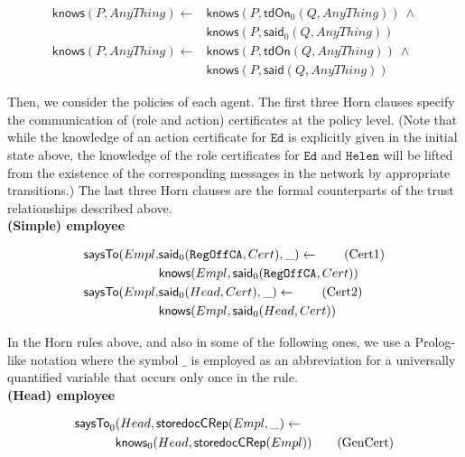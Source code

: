 \documentclass[conference]{IEEEtran}
\begin{document}
\begin{LONG}
\begin{small}\begin{align*}
\mathsf{knows}(P,AnyThing) \leftarrow & \mathsf{knows}(P,\mathsf{tdOn}_{0}(Q,AnyThing)) ~ \wedge \\
											                  & \mathsf{knows}(P,\mathsf{said}_{0}(Q,AnyThing)) \\
\mathsf{knows}(P,AnyThing)  \leftarrow & \mathsf{knows}(P,\mathsf{tdOn}(Q,AnyThing)) ~ \wedge \\
                                                               & \mathsf{knows}(P,\mathsf{said}(Q,AnyThing))
 \end{align*} \end{small}

Then, we consider the policies of each agent.  The first three Horn
clauses specify the communication of (role and action) certificates at
the policy level.  (Note that while the knowledge of an action
certificate for $\mathtt{Ed}$ is explicitly given in the initial state above,
the knowledge of the role certificates for $\mathtt{Ed}$ and $\mathtt{Helen}$ will be
lifted from the existence of the corresponding messages in the network
by appropriate transitions.)  The last three Horn clauses are the
formal counterparts of the trust relationships described above.\\

\noindent
\textbf{(Simple) employee }
  
\begin{small}\begin{align}
\mathsf{saysTo}(Empl,& \mathsf{said}_{0} (\mathtt{RegOffCA},Cert),\_) \leftarrow \tag{Cert1}\\
& \mathsf{knows}(Empl,\mathsf{said}_{0}(\mathtt{RegOffCA},Cert)) \notag \\
\mathsf{saysTo}(Empl,& \mathsf{said}_{0} (Head,Cert),\_) \leftarrow \tag{Cert2} \\
& \mathsf{knows}(Empl,\mathsf{said}_{0}(Head,Cert)) \notag
\end{align}\end{small}

In the Horn rules above, and also in some of the following ones, we use a
Prolog-like notation where the symbol $\_$ is employed as an abbreviation
for a universally quantified variable that occurs only once in the rule.\\

\noindent
\textbf{(Head) employee}

\begin{small}\begin{align*}
\mathsf{saysTo}_{0} & (Head,\mathsf{storedocCRep}(Empl,\_)  \leftarrow \notag \\
& \mathsf{knows}_{0}(Head,\mathsf{storedocCRep}(Empl)) \tag{GenCert} 
\end{align*}\end{small}



\end{LONG}
\end{document}
